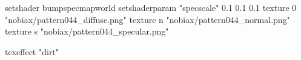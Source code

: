 setshader bumpspecmapworld
setshaderparam "specscale" 0.1 0.1 0.1
   texture 0 "nobiax/pattern044_diffuse.png"
   texture n "nobiax/pattern044_normal.png"
   texture s "nobiax/pattern044_specular.png"

texeffect "dirt"
